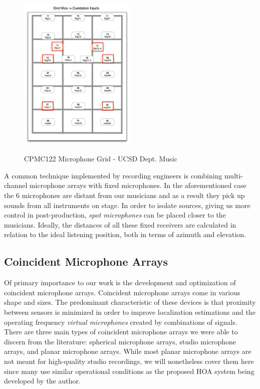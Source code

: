 \begin{figure}[h!]%
\centering
\includegraphics[width=0.5\textwidth]{img/cpmc122-mics.jpg} 
\label{fig:cpmc122-mic-grid}
\caption{CPMC122 Microphone Grid - UCSD Dept. Music}
\end{figure}

A common technique implemented by recording engineers is combining multi-channel microphone arrays with fixed microphones. In the aforementioned case the 6 microphones are distant from our musicians and as a result they pick up sounds from all instruments on stage. In order to isolate sources, giving us more control in post-production, \textit{spot microphones} can be placed closer to the musicians. Ideally, the distances of all these fixed receivers are calculated in relation to the ideal listening position, both in terms of azimuth and elevation. 

\subsection{Coincident Microphone Arrays}

Of primary importance to our work is the development and optimization of coincident microphone arrays. Coincident microphone arrays come in various shape and sizes. The predominant characteristic of these devices is that proximity between sensors is minimized in order to improve localization estimations and the operating frequency \textit{virtual microphones} created by combinations of signals. There are three main types of coincident microphone arrays we were able to discern from the literature: spherical microphone arrays, studio microphone arrays, and planar microphone arrays. While most planar microphone arrays are not meant for high-quality studio recordings, we will nonetheless cover them here since many use similar operational conditions as the proposed HOA system being developed by the author. 
